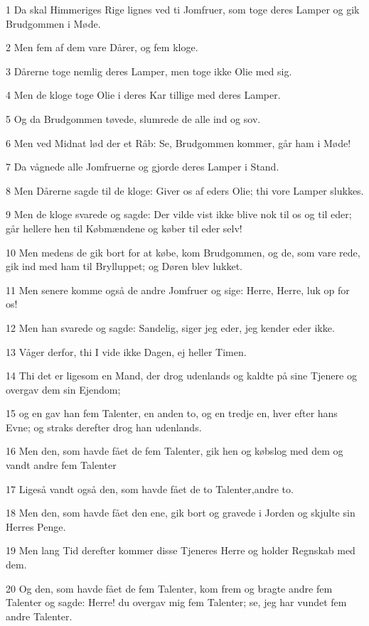 \par 1 Da skal Himmeriges Rige lignes ved ti Jomfruer, som toge deres Lamper og gik Brudgommen i Møde.
\par 2 Men fem af dem vare Dårer, og fem kloge.
\par 3 Dårerne toge nemlig deres Lamper, men toge ikke Olie med sig.
\par 4 Men de kloge toge Olie i deres Kar tillige med deres Lamper.
\par 5 Og da Brudgommen tøvede, slumrede de alle ind og sov.
\par 6 Men ved Midnat lød der et Råb: Se, Brudgommen kommer, går ham i Møde!
\par 7 Da vågnede alle Jomfruerne og gjorde deres Lamper i Stand.
\par 8 Men Dårerne sagde til de kloge: Giver os af eders Olie; thi vore Lamper slukkes.
\par 9 Men de kloge svarede og sagde: Der vilde vist ikke blive nok til os og til eder; går hellere hen til Købmændene og køber til eder selv!
\par 10 Men medens de gik bort for at købe, kom Brudgommen, og de, som vare rede, gik ind med ham til Brylluppet; og Døren blev lukket.
\par 11 Men senere komme også de andre Jomfruer og sige: Herre, Herre, luk op for os!
\par 12 Men han svarede og sagde: Sandelig, siger jeg eder, jeg kender eder ikke.
\par 13 Våger derfor, thi I vide ikke Dagen, ej heller Timen.
\par 14 Thi det er ligesom en Mand, der drog udenlands og kaldte på sine Tjenere og overgav dem sin Ejendom;
\par 15 og en gav han fem Talenter, en anden to, og en tredje en, hver efter hans Evne; og straks derefter drog han udenlands.
\par 16 Men den, som havde fået de fem Talenter, gik hen og købslog med dem og vandt andre fem Talenter
\par 17 Ligeså vandt også den, som havde fået de to Talenter,andre to.
\par 18 Men den, som havde fået den ene, gik bort og gravede i Jorden og skjulte sin Herres Penge.
\par 19 Men lang Tid derefter kommer disse Tjeneres Herre og holder Regnskab med dem.
\par 20 Og den, som havde fået de fem Talenter, kom frem og bragte andre fem Talenter og sagde: Herre! du overgav mig fem Talenter; se, jeg har vundet fem andre Talenter.
